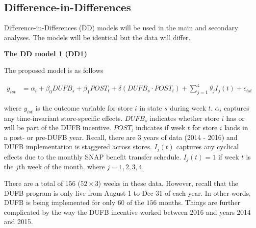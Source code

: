 \documentclass[12pt,letterpaperpaper,]{book}
\begin{document}
\subsection*{Difference-in-Differences}\label{difference-in-differences}

Difference-in-Differences (DD) models will be used in the main and
secondary analyses. The models will be identical but the data will
differ.

\textbf{The DD model 1 (DD1)}

The proposed model is as follows

\[
\begin{aligned}
  y_{ist}  &= \alpha_i + \beta_0 DUFB_{s} + \beta_1 POST_{t} + \delta (DUFB_{s} \cdot POST_{t}) + \sum_{j=1}^4 \theta_{j} I_{j}(t) + \epsilon_{ist}
\end{aligned}
\]

where \(y_{ist}\) is the outcome variable for store \(i\) in state \(s\)
during week \(t\). \(\alpha_i\) captures any time-invariant
store-specific effects. \(DUFB_{s}\) indicates whether store \(i\) has
or will be part of the DUFB incentive. \(POST_{t}\) indicates if week
\(t\) for store \(i\) lands in a post- or pre-DUFB year. Recall, there
are 3 years of data (2014 - 2016) and DUFB implementation is staggered
across stores. \(I_{j}(t)\) captures any cyclical effects due to the
monthly SNAP benefit transfer schedule. \(I_{j}(t) = 1\) if week \(t\)
is the \(j\)th week of the month, where \(j = 1,2,3,4\).

There are a total of \(156\) (\(52 \times 3\)) weeks in these data.
However, recall that the DUFB program is only live from August 1 to Dec
31 of each year. In other words, DUFB is being implemented for only
\(60\) of the \(156\) months. Things are further complicated by the way
the DUFB incentive worked between 2016 and years 2014 and 2015.
\end{document}
